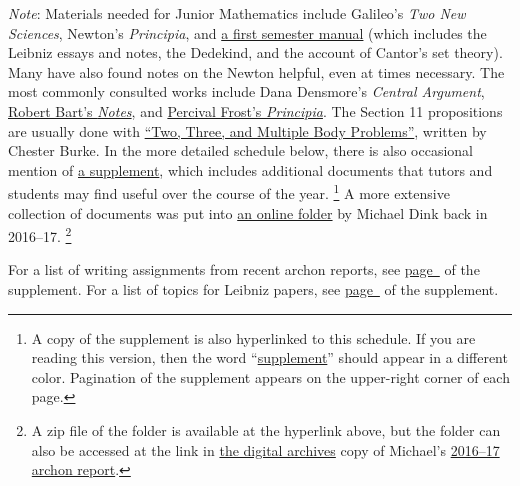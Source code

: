 \documentclass[10pt]{article}
\begin{document}
{\small \emph{Note}: Materials needed for Junior Mathematics 
include Galileo's \emph{Two New Sciences}, Newton's \emph{Principia}, and
\href{https://drive.google.com/file/d/13h-us1vPTZjGNSpHRpInOJR5JjXLNdWb/view?usp=sharing}%
{a first semester manual} (which includes the Leibniz essays and notes,
the Dedekind, and the account of Cantor's set theory).  
Many have also found notes on the Newton helpful, even at times necessary.  
The most commonly consulted works include Dana Densmore's \emph{Central Argument},
\href{https://drive.google.com/file/d/0BwccG5Ei3816aUtwck5GTUVRWkk/view?usp=sharing}{Robert
Bart's \emph{Notes}}, and
\href{https://drive.google.com/file/d/0BwccG5Ei3816cHlRaktYaTJRM0E/view?usp=sharing}%
{Percival Frost's \emph{Principia}}. 
The Section 11 propositions are usually done with
\href{https://drive.google.com/file/d/1c0gRZDPmndb5C2JiWYSOIiMQD-mNR2cD/view?usp=sharing}%
{``Two, Three, and Multiple Body Problems''}, written by Chester Burke.
In the more detailed schedule below, there is also occasional mention of
\href{https://drive.google.com/file/d/1PP99RsI_xEZ8rkgXSOlNBS2Wuk_CJkvN/view?usp=sharing}%
{a supplement}, which includes additional documents
that tutors and students may find useful over the course of the year.%
\footnote{A copy of the supplement is also hyperlinked to this schedule. 
If you are reading this version, then the word ``\hyperref[supple.1]{supplement}''
should appear in a different color. Pagination of the supplement appears on the upper-right
corner of each page.}
A more extensive collection of documents was put into
\href{https://drive.google.com/file/d/1iZOownvFcTZxxFA6KRutjVLpIjE74503/view?usp=sharing}%
{an online folder} by Michael Dink back in 2016--17.%
\footnote{A zip file of the folder is available at the hyperlink above,
but the folder can also be accessed at the link 
in \href{http://digitalarchives.sjc.edu/faculty}{the digital archives} copy
of Michael's \href{https://digitalarchives.sjc.edu/items/show/2677}{2016--17 archon report}.}

For a list of writing assignments from recent archon reports, see \hyperref[supple.106]{page~\pageref{supple.106}} of the supplement. 
For a list of topics for Leibniz papers, see
	\hyperref[supple.58]{page~\pageref{supple.58}} of
	the 
	supplement.}


\end{document}
